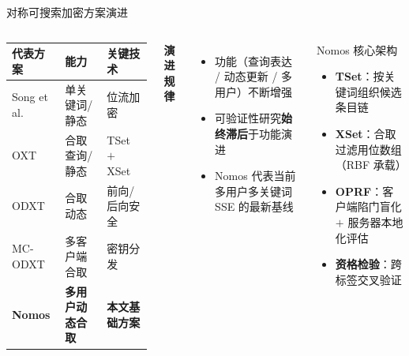 \begin{frame}{对称可搜索加密方案演进}

  \begin{columns}[T]
      \begin{tabular}{lll}
        \toprule
        \textbf{代表方案} & \textbf{能力} & \textbf{关键技术} \\
        \midrule
        Song et al. & 单关键词/静态 & 位流加密 \\
        OXT & 合取查询/静态 & TSet $+$ XSet \\
        ODXT & 合取动态 & 前向/后向安全 \\
        MC-ODXT & 多客户端合取 & 密钥分发 \\
        \textbf{Nomos} & \textbf{多用户动态合取} & \textbf{本文基础方案} \\
        \bottomrule
      \end{tabular}

      \vspace{0.8em}
      \textbf{演进规律}
      \begin{itemize}
        \item 功能（查询表达 / 动态更新 / 多用户）不断增强
        \item 可验证性研究\textbf{始终滞后}于功能演进
        \item Nomos 代表当前多用户多关键词 SSE 的最新基线
      \end{itemize}

      \begin{block}{Nomos 核心架构}
        \small
        \begin{itemize}
          \item \textbf{TSet}：按关键词组织候选条目链
          \item \textbf{XSet}：合取过滤用位数组（RBF 承载）
          \item \textbf{OPRF}：客户端陷门盲化 $+$ 服务器本地化评估
          \item \textbf{资格检验}：跨标签交叉验证
        \end{itemize}
      \end{block}
  \end{columns}

\end{frame}

